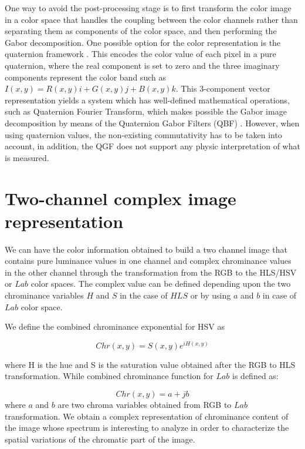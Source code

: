 One way to avoid the post-processing stage is to first transform the color image in a color space that handles the coupling between the color channels rather than separating them as components of the color space, and then performing the Gabor decomposition. One possible option for the color representation is the quaternion framework \cite{Sangwine.Ell: VISP: 2000}. This encodes the color value of each pixel in a pure quaternion, where the real component is set to zero and the three imaginary components represent the color band such as $I(x, y) = R (x, y) i + G (x, y) j + B (x, y) k $. This 3-component vector representation yields a system which has well-defined mathematical operations, such as Quaternion Fourier Transform, which makes possible the Gabor image decomposition by means of the Quaternion Gabor Filters (QBF) \cite{Subakan.Vemuri:EMMCVPR:2009}. However, when using quaternion values, the non-existing commutativity has to be taken into account, in addition, the QGF does not support any physic interpretation of what is measured.

\section{Two-channel complex image representation}

We can have the color information obtained to build a two channel image that contains pure luminance values in one channel and complex chrominance values in the other channel through the transformation from the RGB to the HLS/HSV or $Lab$ color spaces. The complex value can be defined depending upon the two chrominance variables $H$ and $S$ in the case of $HLS$ or by using $a$ and $b$ in case of $Lab$ color space. 

We define the combined chrominance exponential for HSV as

\begin{equation}\label{eq:chrominance_hsv}
    Chr(x,y) = S(x,y) e^{iH(x,y)}
\end{equation}

where H is the hue and S is the saturation value obtained after the RGB to HLS transformation. While combined chrominance function for $Lab$ is defined as:

\begin{equation}\label{eq:chrominance_lab}
    Chr(x,y) = a + jb
\end{equation}
where $a$ and $b$ are two chroma variables obtained from RGB to $Lab$ transformation. We obtain a complex representation of chrominance content of the image whose spectrum is interesting to analyze in order to characterize the spatial variations of the chromatic part of the image. 



